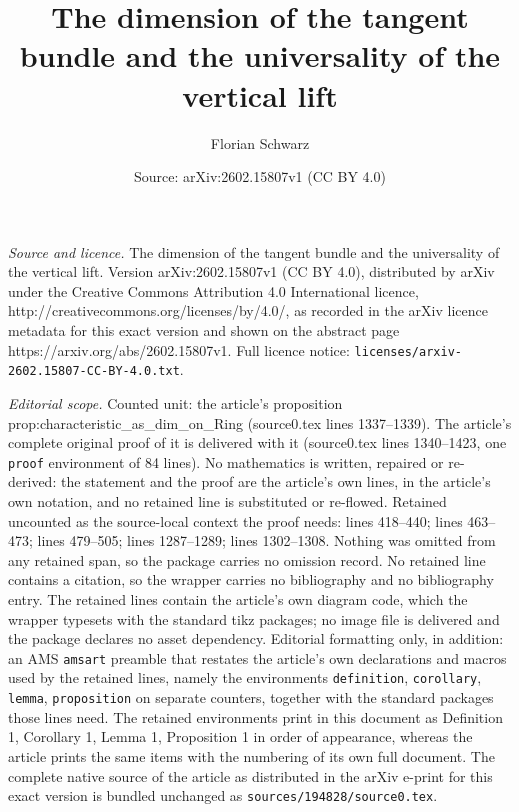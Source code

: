 \documentclass[10pt,a4paper]{amsart}
\title{The dimension of the tangent bundle and the universality of the vertical lift}
\author{Florian Schwarz}
\date{Source: arXiv:2602.15807v1 (CC BY 4.0)}
\begin{document}
\maketitle

\noindent\emph{Source and licence.} The dimension of the tangent bundle and the universality of the vertical lift. Version arXiv:2602.15807v1 (CC BY 4.0), distributed by arXiv under the Creative Commons Attribution 4.0 International licence, http://creativecommons.org/licenses/by/4.0/, as recorded in the arXiv licence metadata for this exact version and shown on the abstract page https://arxiv.org/abs/2602.15807v1. Full licence notice: \texttt{licenses/arxiv-2602.15807-CC-BY-4.0.txt}.\par\smallskip

\noindent\textit{Editorial scope.} Counted unit: the article's proposition prop:characteristic\_as\_dim\_on\_Ring (source0.tex lines 1337--1339). The article's complete original proof of it is delivered with it (source0.tex lines 1340--1423, one \texttt{proof} environment of 84 lines). No mathematics is written, repaired or re-derived: the statement and the proof are the article's own lines, in the article's own notation, and no retained line is substituted or re-flowed.  Retained uncounted as the source-local context the proof needs: lines 418--440; lines 463--473; lines 479--505; lines 1287--1289; lines 1302--1308.  Nothing was omitted from any retained span, so the package carries no omission record.  No retained line contains a citation, so the wrapper carries no bibliography and no bibliography entry.  The retained lines contain the article's own diagram code, which the wrapper typesets with the standard tikz packages; no image file is delivered and the package declares no asset dependency.  Editorial formatting only, in addition: an AMS \texttt{amsart} preamble that restates the article's own declarations and macros used by the retained lines, namely the environments \texttt{definition}, \texttt{corollary}, \texttt{lemma}, \texttt{proposition} on separate counters, together with the standard packages those lines need.  The retained environments print in this document as Definition 1, Corollary 1, Lemma 1, Proposition 1 in order of appearance, whereas the article prints the same items with the numbering of its own full document.  The complete native source of the article as distributed in the arXiv e-print for this exact version is bundled unchanged as \texttt{sources/194828/source0.tex}.
\end{document}
